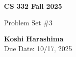 \documentclass[11pt]{article}
\renewenvironment{shaded}{%
  \def\FrameCommand{\fboxsep=\FrameSep \colorbox{shadecolor}}%
  \MakeFramed{\advance\hsize-\width \FrameRestore\FrameRestore}}%
 {\endMakeFramed}
\begin{document}
\begin{titlepage}
   \begin{center}
       \vspace*{9cm}

       \textbf{CS 332 Fall 2025}

       \vspace{0.5cm}
        Problem Set \#3
        \vfill

       \textbf{Koshi Harashima}\\
       Due Date: 10/17, 2025
            
   \end{center}
\end{titlepage}

\pagebreak


\begin{shaded}


\end{shaded}
\end{document}
